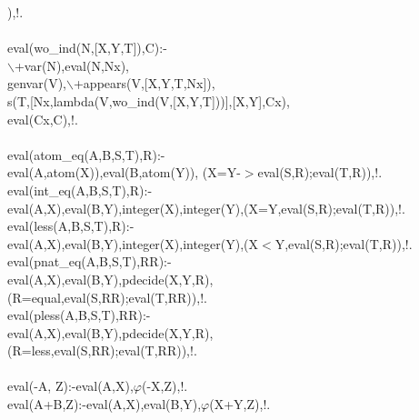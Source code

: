 \documentclass[11pt]{report}
\begin{document}
\begin{sf}
\begin{tabbing}
\hspace{1em}),!.\\[-0.7ex]
\\[-0.15ex]
eval(wo\_\hspace{0.1em}ind(N,[X,Y,T]),C):-\\[-0.15ex]
	$\backslash$+var(N),eval(N,Nx),\\[-0.15ex]
	genvar(V),$\backslash$+appears(V,[X,Y,T,Nx]),\\[-0.15ex]
	s(T,[Nx,lambda(V,wo\_\hspace{0.1em}ind(V,[X,Y,T]))],[X,Y],Cx),\\[-0.15ex]
	eval(Cx,C),!.\\[-0.7ex]
\\[-0.15ex]
eval(atom\_\hspace{0.1em}eq(A,B,S,T),R):-\\[-0.15ex]
\hspace{1em}eval(A,atom(X)),eval(B,atom(Y)), (X=Y-$>$eval(S,R);eval(T,R)),!.\\[-0.15ex]
eval(int\_\hspace{0.1em}eq(A,B,S,T),R):-\\[-0.15ex]
\hspace{1em}eval(A,X),eval(B,Y),integer(X),integer(Y),(X=Y,eval(S,R);eval(T,R)),!.\\[-0.15ex]
eval(less(A,B,S,T),R):-\\[-0.15ex]
\hspace{1em}eval(A,X),eval(B,Y),integer(X),integer(Y),(X$<$Y,eval(S,R);eval(T,R)),!.\\[-0.15ex]
eval(pnat\_\hspace{0.1em}eq(A,B,S,T),RR):-\\[-0.15ex]
\hspace{1em}eval(A,X),eval(B,Y),pdecide(X,Y,R),\\[-0.15ex]
\hspace{1em}(R=equal,eval(S,RR);eval(T,RR)),!.\\[-0.15ex]
eval(pless(A,B,S,T),RR):-\\[-0.15ex]
\hspace{1em}eval(A,X),eval(B,Y),pdecide(X,Y,R),\\[-0.15ex]
\hspace{1em}(R=less,eval(S,RR);eval(T,RR)),!.\\[-0.7ex]
\\[-0.15ex]
eval(-A, Z):-eval(A,X),$\varphi$(-X,Z),!.\\[-0.15ex]
eval(A+B,Z):-eval(A,X),eval(B,Y),$\varphi$(X+Y,Z),!.\\[-0.15ex]

\end{tabbing}
\end{sf}
\end{document}
